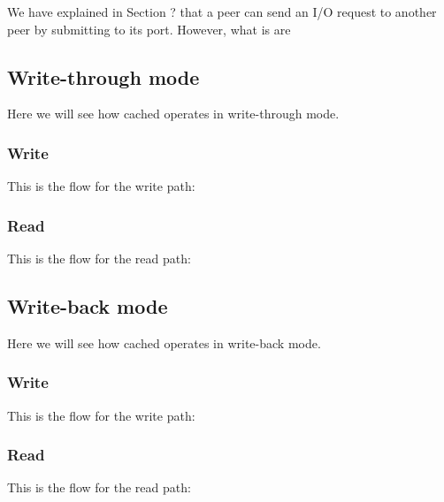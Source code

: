 We have explained in Section ? that a peer can send an I/O request to another 
peer by submitting to its port. However, what is are


\begin{comment}
Let's attempt to make the above a bit clearer. When cached receives a request, 
it first checks the request target (i.e. the object name and then calculates 
which bucket objects are within the request's range. It is easy to see that this 
is a 1:1 mapping to the object's data.
\end{comment}

\subsection{Write-through mode}

Here we will see how cached operates in write-through mode.

\subsubsection{Write}

This is the flow for the write path:

\subsubsection{Read}

This is the flow for the read path:

\subsection{Write-back mode}

Here we will see how cached operates in write-back mode.

\subsubsection{Write}

This is the flow for the write path:

\subsubsection{Read}

This is the flow for the read path:

